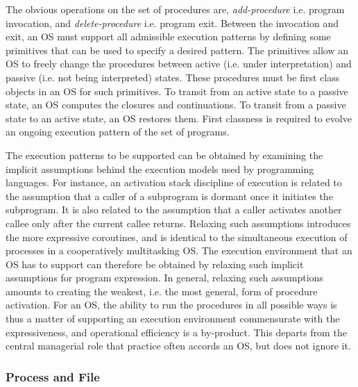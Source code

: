 \documentclass[draft]{article}
\begin{document}
The   obvious    operations   on   the   set    of   procedures   are,
\emph{add-procedure}      i.e.       program      invocation,      and
\emph{delete-procedure}  i.e.  program  exit.  Between  the invocation
and  exit, an  OS must  support all  admissible execution  patterns by
defining  some  primitives that  can  be  used  to specify  a  desired
pattern.  The primitives  allow an OS to freely  change the procedures
between  active (i.e.   under interpretation)  and passive  (i.e.  not
being  interpreted)  states.  These  procedures  must  be first  class
objects in an OS for such primitives.  To transit from an active state
to a passive state, an OS computes the closures and continuations.  To
transit from a passive state to  an active state, an OS restores them.
First classness is required to  evolve an ongoing execution pattern of
the set of programs.

The execution  patterns to be  supported can be obtained  by examining
the  implicit   assumptions  behind  the  execution   models  used  by
programming languages.   For instance, an  activation stack discipline
of  execution  is  related  to  the  assumption that  a  caller  of  a
subprogram is  dormant once it  initiates the subprogram.  It  is also
related to the assumption that  a caller activates another callee only
after   the  current  callee   returns.   Relaxing   such  assumptions
introduces  the more expressive  coroutines, and  is identical  to the
simultaneous  execution of processes  in a  cooperatively multitasking
OS.  The execution environment that an OS has to support can therefore
be  obtained  by  relaxing   such  implicit  assumptions  for  program
expression.  In general, relaxing such assumptions amounts to creating
the weakest, i.e. the most general, form of procedure activation.  For
an OS, the ability to run  the procedures in all possible ways is thus
a matter of supporting  an execution environment commensurate with the
expressiveness,  and  operational efficiency  is  a by-product.   This
departs from  the central managerial role that  practice often accords
an OS, but does not ignore it.

\subsubsection{Process and File}
\label{sec:process:and:file}
\end{document}
